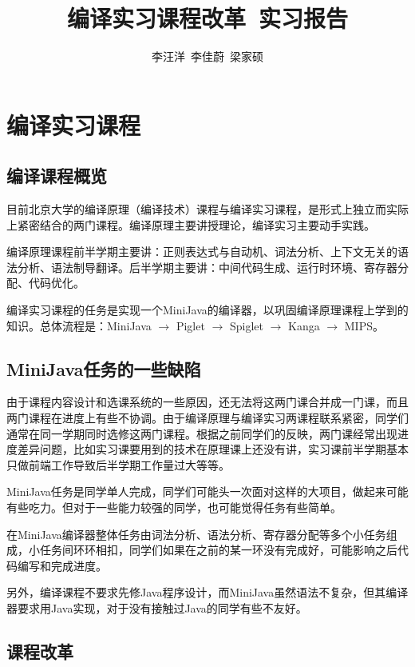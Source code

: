 \documentclass[a4paper]{ctexart}
\title{编译实习课程改革\ 实习报告}
\date{}
\author{李汪洋\ 李佳蔚\ 梁家硕}
\begin{document}
\maketitle
\tableofcontents
\newpage

\section{编译实习课程}

\subsection{编译课程概览}

目前北京大学的编译原理（编译技术）课程与编译实习课程，是形式上独立而实际上紧密结合的两门课程。编译原理主要讲授理论，编译实习主要动手实践。

编译原理课程前半学期主要讲：正则表达式与自动机、词法分析、上下文无关的语法分析、语法制导翻译。后半学期主要讲：中间代码生成、运行时环境、寄存器分配、代码优化。

编译实习课程的任务是实现一个MiniJava的编译器，以巩固编译原理课程上学到的知识。总体流程是：MiniJava $\rightarrow$ Piglet $\rightarrow$ Spiglet $\rightarrow$ Kanga $\rightarrow$ MIPS。

\subsection{MiniJava任务的一些缺陷}

由于课程内容设计和选课系统的一些原因，还无法将这两门课合并成一门课，而且两门课程在进度上有些不协调。由于编译原理与编译实习两课程联系紧密，同学们通常在同一学期同时选修这两门课程。根据之前同学们的反映，两门课经常出现进度差异问题，比如实习课要用到的技术在原理课上还没有讲，实习课前半学期基本只做前端工作导致后半学期工作量过大等等。

MiniJava任务是同学单人完成，同学们可能头一次面对这样的大项目，做起来可能有些吃力。但对于一些能力较强的同学，也可能觉得任务有些简单。

在MiniJava编译器整体任务由词法分析、语法分析、寄存器分配等多个小任务组成，小任务间环环相扣，同学们如果在之前的某一环没有完成好，可能影响之后代码编写和完成进度。

另外，编译课程不要求先修Java程序设计，而MiniJava虽然语法不复杂，但其编译器要求用Java实现，对于没有接触过Java的同学有些不友好。

\subsection{课程改革}
\end{document}
